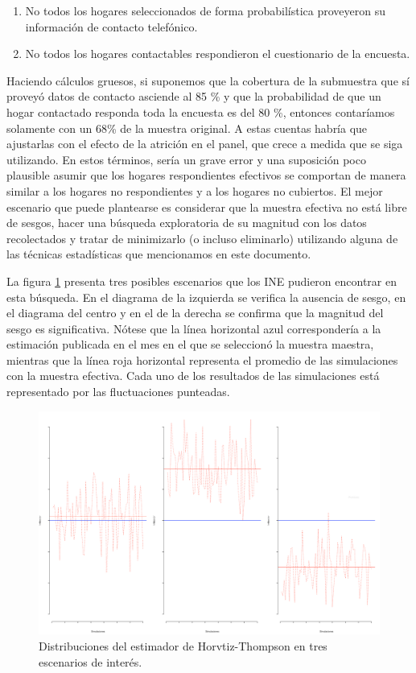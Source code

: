 \documentclass[
  12pt,
]{book}
\providecommand{\tightlist}{%
  \setlength{\itemsep}{0pt}\setlength{\parskip}{0pt}}
\begin{document}
\begin{enumerate}
\def\labelenumi{\arabic{enumi}.}
\tightlist
\item
  No todos los hogares seleccionados de forma probabilística proveyeron su información de contacto telefónico.
\item
  No todos los hogares contactables respondieron el cuestionario de la encuesta.
\end{enumerate}

Haciendo cálculos gruesos, si suponemos que la cobertura de la submuestra que sí proveyó datos de contacto asciende al 85 \% y que la probabilidad de que un hogar contactado responda toda la encuesta es del 80 \%, entonces contaríamos solamente con un 68\% de la muestra original. A estas cuentas habría que ajustarlas con el efecto de la atrición en el panel, que crece a medida que se siga utilizando. En estos términos, sería un grave error y una suposición poco plausible asumir que los hogares respondientes efectivos se comportan de manera similar a los hogares no respondientes y a los hogares no cubiertos. El mejor escenario que puede plantearse es considerar que la muestra efectiva no está libre de sesgos, hacer una búsqueda exploratoria de su magnitud con los datos recolectados y tratar de minimizarlo (o incluso eliminarlo) utilizando alguna de las técnicas estadísticas que mencionamos en este documento.

La figura \ref{fig:fight3dist} presenta tres posibles escenarios que los INE pudieron encontrar en esta búsqueda. En el diagrama de la izquierda se verifica la ausencia de sesgo, en el diagrama del centro y en el de la derecha se confirma que la magnitud del sesgo es significativa. Nótese que la línea horizontal azul correspondería a la estimación publicada en el mes en el que se seleccionó la muestra maestra, mientras que la línea roja horizontal representa el promedio de las simulaciones con la muestra efectiva. Cada uno de los resultados de las simulaciones está representado por las fluctuaciones punteadas.

\begin{figure}

{\centering \includegraphics[width=0.5\linewidth]{Pics/calnr1} 

}

\caption{Distribuciones del estimador de Horvtiz-Thompson en tres escenarios de interés.}\label{fig:fight3dist}
\end{figure}
\end{document}
